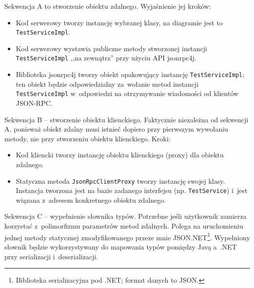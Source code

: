 Sekwencja A to stworzenie obiektu zdalnego. Wyjaśnienie jej kroków:
\begin{itemize}
	\item Kod serwerowy tworzy instancję wybranej klasy, na diagramie jest to \texttt{TestServiceImpl}.
	\item Kod serwerowy wystawia publiczne metody stworzonej instancji \texttt{TestServiceImpl} ,,na zewnątrz'' przy użyciu API jsonrpc4j.
	\item Biblioteka jsonrpc4j tworzy obiekt opakowujący instancję \texttt{TestServiceImpl}; ten obiekt będzie odpowiedzialny za~wołanie metod instancji \texttt{TestServiceImpl} w~odpowiedzi na otrzymywanie wiadomości od klientów JSON-RPC.
\end{itemize}

Sekwencja B -- stworzenie obiektu klienckiego. Faktycznie niezależna od sekwencji A, ponieważ obiekt zdalny musi istnieć dopiero przy pierwszym wywołaniu metody, nie przy stworzeniu obiektu klienckiego. Kroki:
\begin{itemize}
	\item Kod kliencki tworzy instancję obiektu klienckiego (proxy) dla obiektu zdalnego.
	\item Statyczna metoda \texttt{JsonRpcClientProxy} tworzy instancję swojej klasy. Instancja tworzona jest na bazie zadanego interfejsu (np. \texttt{TestService}) i~jest wiązana z~adresem konkretnego obiektu zdalnego.
\end{itemize}

Sekwencja C -- wypełnienie słownika typów. Potrzebne jeśli użytkownik zamierza korzystać z~polimorfizmu parametrów metod zdalnych. Polega na uruchomieniu jednej metody statycznej zmodyfikowanego przeze mnie JSON.NET\footnote{Biblioteka serializacyjna pod .NET; format danych to JSON.}. Wypełniony słownik będzie wykorzystywany do mapowania typów pomiędzy Javą a~.NET przy serializacji i~deserializacji.


